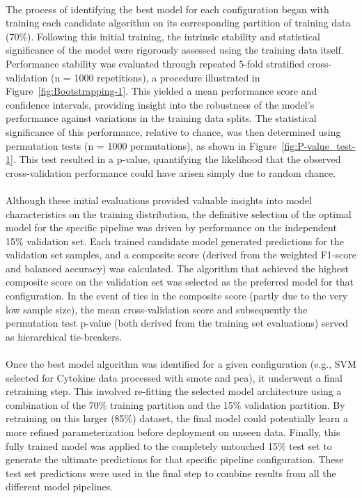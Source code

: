 \documentclass[12pt,a4paper]{report}
\begin{document}
\\
\noindent
The process of identifying the best model for each configuration began with training each candidate algorithm on its corresponding partition of training data (70\%). Following this initial training, the intrinsic stability and statistical significance of the model were rigorously assessed using the training data itself. Performance stability was evaluated through repeated 5-fold stratified cross-validation (n = 1000 repetitions), a procedure illustrated in Figure~\ref{fig:Bootstrapping-1}. This yielded a mean performance score and confidence intervals, providing insight into the robustness of the model's performance against variations in the training data splits. The statistical significance of this performance, relative to chance, was then determined using permutation tests (n = 1000 permutations), as shown in Figure~\ref{fig:P-value_test-1}. This test resulted in a p-value, quantifying the likelihood that the observed cross-validation performance could have arisen simply due to random chance.\\
\\
Although these initial evaluations provided valuable insights into model characteristics on the training distribution, the definitive selection of the optimal model for the specific pipeline was driven by performance on the independent 15\% validation set. Each trained candidate model generated predictions for the validation set samples, and a composite score (derived from the weighted F1-score and balanced accuracy) was calculated. The algorithm that achieved the highest composite score on the validation set was selected as the preferred model for that configuration. In the event of ties in the composite score (partly due to the very low sample size), the mean cross-validation score and subsequently the permutation test p-value (both derived from the training set evaluations) served as hierarchical tie-breakers.\\
\\
Once the best model algorithm was identified for a given configuration (e.g., SVM selected for Cytokine data processed with \gls{smote} and \gls{pca}), it underwent a final retraining step. This involved re-fitting the selected model architecture using a combination of the 70\% training partition and the 15\% validation partition. By retraining on this larger (85\%) dataset, the final model could potentially learn a more refined parameterization before deployment on unseen data. Finally, this fully trained model was applied to the completely untouched 15\% test set to generate the ultimate predictions for that specific pipeline configuration. These test set predictions were used in the final step to combine results from all the different model pipelines.\\
\end{document}

